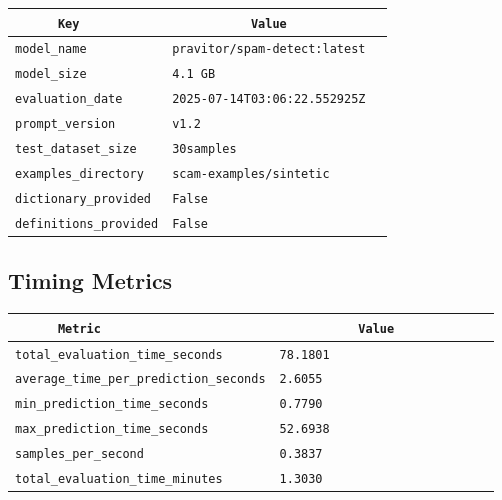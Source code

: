 \documentclass{article}
\begin{document}
\begin{center}
\begin{tabular}{l | l} \hline
    \verb|      Key      | & \verb|           Value           | \\ \hline
    \hline
    \verb|model_name    | & \verb|pravitor/spam-detect:latest  | \\ \hline
    \verb|model_size    | & \verb|4.1 GB                       | \\ \hline
    \verb|evaluation_date| & \verb|2025-07-14T03:06:22.552925Z  | \\ \hline
    \verb|prompt_version| & \verb|v1.2                         | \\ \hline
    \verb|test_dataset_size| & \verb|30samples                    | \\ \hline
    \verb|examples_directory| & \verb|scam-examples/sintetic       | \\ \hline
    \verb|dictionary_provided| & \verb|False                        | \\ \hline
    \verb|definitions_provided| & \verb|False                        | \\ \hline
\end{tabular}
\end{center}

\subsection{Timing Metrics}

\begin{center}
\begin{tabular}{l | l} \hline
    \verb|      Metric     | & \verb|           Value           | \\ \hline
    \hline
    \verb|total_evaluation_time_seconds| & \verb|78.1801                      | \\ \hline
    \verb|average_time_per_prediction_seconds| & \verb|2.6055                       | \\ \hline
    \verb|min_prediction_time_seconds| & \verb|0.7790                       | \\ \hline
    \verb|max_prediction_time_seconds| & \verb|52.6938                      | \\ \hline
    \verb|samples_per_second| & \verb|0.3837                       | \\ \hline
    \verb|total_evaluation_time_minutes| & \verb|1.3030                       | \\ \hline
\end{tabular}
\end{center}
\end{document}
